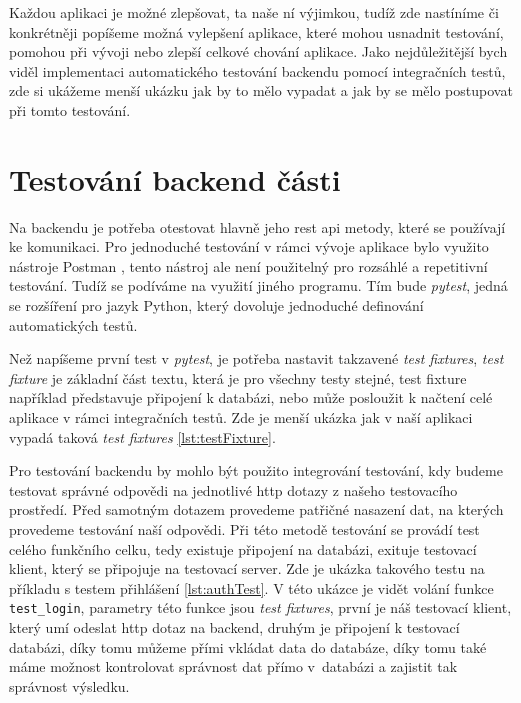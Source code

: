 Každou aplikaci je možné zlepšovat, ta naše ní výjimkou, tudíž zde nastíníme či konkrétněji popíšeme možná vylepšení aplikace,
které mohou usnadnit testování, pomohou při vývoji nebo zlepší celkové chování aplikace. Jako nejdůle\-žitější bych viděl implementaci
automatického testování backendu pomocí integračních testů, zde si ukážeme menší ukázku jak by to mělo vypadat a jak by se mělo postupovat
při tomto testování.

\section{Testování backend části}

Na backendu je potřeba otestovat hlavně jeho \gls{rest} \gls{api} metody, které se používají ke komunikaci. Pro jednoduché
testování v rámci vývoje aplikace bylo využito nástroje Postman \cite{postmanSW}, tento nástroj ale není použitelný pro rozsáhlé
a repetitivní testování. Tudíž se podíváme na využití jiného programu. Tím bude \textit{pytest}, jedná se rozšíření pro jazyk Python,
který dovoluje jednoduché definování automatických testů.

Než napíšeme první test v \textit{pytest}, je potřeba nastavit takzavené \textit{test fixtures}, \textit{test fixture} je základní část
textu, která je pro všechny testy stejné, test fixture například představuje připojení k databázi, nebo může posloužit k načtení
celé aplikace v rámci integračních testů. Zde je menší ukázka jak v naší aplikaci vypadá taková \textit{test fixtures} \ref{lst:testFixture}.

Pro testování backendu by mohlo být použito integrování testování, kdy budeme testovat správné odpovědi na jednotlivé \gls{http} dotazy z našeho
testovacího prostředí. Před samotným dotazem provedeme patřičné nasazení dat, na kterých provedeme testování naší odpovědi. Při této metodě
testování se provádí test celého funkčního celku, tedy existuje připojení na databázi, exituje testovací
klient, který se připojuje na testovací server. Zde je ukázka takového testu na příkladu s testem přihlášení \ref{lst:authTest}. V této ukázce
je vidět volání funkce \texttt{test\_login}, parametry této funkce jsou \textit{test fixtures}, první je náš testovací klient, který umí odeslat
\gls{http} dotaz na backend, druhým je připojení k testovací databázi, díky tomu můžeme přími vkládat data do databáze, díky tomu také máme
možnost kontrolovat správnost dat přímo v~databázi a zajistit tak správnost výsledku.

